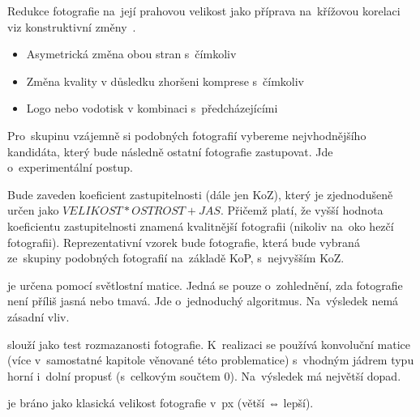 Redukce fotografie na~její prahovou velikost jako příprava na~křížovou korelaci viz konstruktivní změny~\cite{fftw3}.

\begin{itemize}
	\setlength{\parskip}{0pt}
	\setlength{\itemsep}{0pt}
	\item {Asymetrická změna obou stran s~čímkoliv}
	\item {Změna kvality v důsledku zhoršeni komprese s~čímkoliv}
	\item {Logo nebo vodotisk v kombinaci s~předcházejícími}
\end{itemize}

Pro~skupinu vzájemně si podobných fotografií vybereme nejvhodnějšího kandidáta, který bude následně ostatní fotografie zastupovat. Jde o~experimentální postup.

Bude zaveden koeficient zastupitelnosti (dále jen KoZ), který je zjednodušeně určen jako $ VELIKOST * OSTROST + JAS $. Přičemž platí, že vyšší hodnota koeficientu zastupitelnosti znamená kvalitnější fotografii (nikoliv na~oko hezčí fotografii). Reprezentativní vzorek bude fotografie, která bude vybraná ze~skupiny podobných fotografií na~základě KoP, s~nejvyšším KoZ.


je určena pomocí světlostní matice. Jedná se pouze o~zohlednění, zda fotografie není příliš jasná nebo tmavá. Jde o~jednoduchý algoritmus. Na~výsledek nemá zásadní vliv.

slouží jako test rozmazanosti fotografie. K~realizaci se používá konvoluční matice (více v~samostatné kapitole věnované této problematice) s~vhodným jádrem typu horní i~dolní propusť (s~celkovým součtem 0). Na~výsledek má největší dopad.

je bráno jako klasická velikost fotografie v~px (větší ⇔ lepší).

